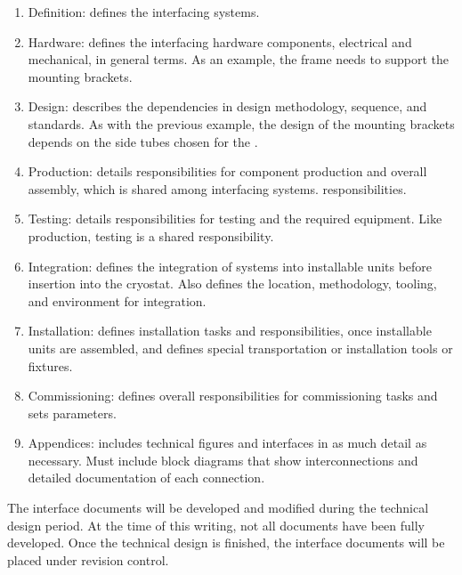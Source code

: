 \begin{enumerate}
 \item Definition: defines the interfacing systems.
 \item Hardware: defines the interfacing hardware components,
   electrical and mechanical, in general terms. As an
   example, the  frame needs to support the 
   mounting brackets.
 \item Design: describes the dependencies in design
   methodology, sequence, and standards. As with the
   previous example, the design of the  mounting
   brackets depends on the side tubes chosen for the .
 \item Production: details responsibilities for component production and overall assembly, which is
    shared among interfacing systems. %
   responsibilities.
 \item Testing: details responsibilities for testing and  the required equipment. Like production, testing is a shared  responsibility. 
 \item Integration: defines the integration of systems into installable units
   before insertion into the cryostat. %
   Also defines the location, methodology, tooling, and environment for integration. %
 \item Installation: defines installation tasks and responsibilities, once
   installable units are assembled, and  defines  %
   special transportation or installation tools or fixtures. %
 \item Commissioning: defines overall responsibilities for
   commissioning tasks  and sets parameters. %
 \item Appendices: includes technical figures and interfaces %
   in as much detail as necessary. Must include block diagrams that
   show interconnections and detailed documentation of each connection.
\end{enumerate}


The interface documents will be developed and modified during the
technical design period. At the time of this writing, not all
documents have been fully developed. Once the technical design is
finished, the interface documents will be placed under revision
control.

